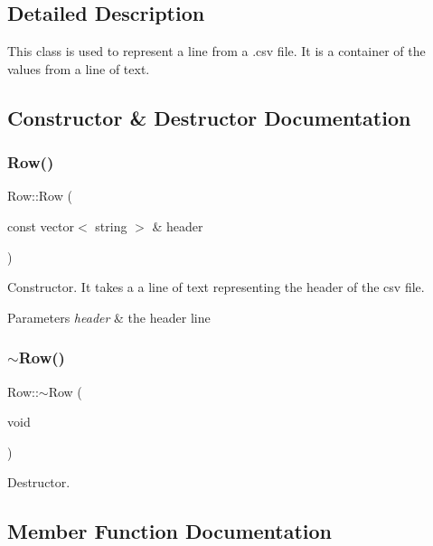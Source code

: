 \subsection{Detailed Description}
This class is used to represent a line from a .csv file. It is a container of the values from a line of text. 

\subsection{Constructor \& Destructor Documentation}
\mbox{\label{class_row_afc5afcd4b8560ddd3b7372df2bc063a8}} 
\subsubsection{\texorpdfstring{Row()}{Row()}}
{\footnotesize\ttfamily Row\+::\+Row (\begin{DoxyParamCaption}\item[{const vector$<$ string $>$ \&}]{header }\end{DoxyParamCaption})}

Constructor. It takes a a line of text representing the header of the csv file. 
\begin{DoxyParams}{Parameters}
{\em header} & the header line \\
\hline
\end{DoxyParams}
\mbox{\label{class_row_a671be9f718722eccb2d3121f1579733e}} 
\subsubsection{\texorpdfstring{$\sim$\+Row()}{~Row()}}
{\footnotesize\ttfamily Row\+::$\sim$\+Row (\begin{DoxyParamCaption}\item[{void}]{ }\end{DoxyParamCaption})}

Destructor. 

\subsection{Member Function Documentation}
\mbox{\label{class_row_a06931bff452df5a451da2268423bb6ea}} 
